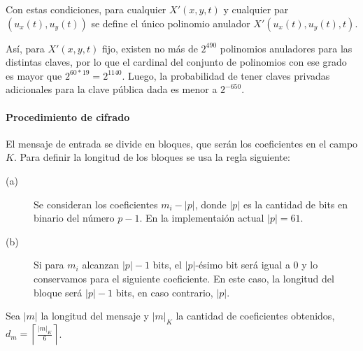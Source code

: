 \documentclass[12pt]{article}
\begin{document}
Con estas condiciones, para cualquier $X'(x,y,t)$ y cualquier par  $(u_x(t),u_y(t))$ se define el \'unico polinomio anulador  $X'(u_x(t),u_y(t),t)$. 

As\'i, para  $X'(x,y,t)$ fijo, existen no m\'as de $2^{490}$ polinomios anuladores para las distintas claves, por lo que el cardinal del conjunto de polinomios con ese grado es mayor que $2^{60*19}=2^{1140}$. Luego, la probabilidad de tener claves privadas adicionales para la clave p\'ublica dada es menor a  $2^{-650}$.



\paragraph*{Procedimiento de cifrado}
\noindent

El mensaje de entrada se divide en bloques, que ser\'an los coeficientes en el campo $K$. Para definir la longitud de los bloques se usa la regla siguiente:


\begin{description}
\item[(a)] Se consideran los coeficientes  $m_i- |p|$, donde $|p|$ es la cantidad de bits en binario del número $p-1$. En la implementaión actual $|p|=61$.

\item[(b)] Si para $m_i$ alcanzan $|p|-1$ bits, el  $|p|$-\'esimo bit ser\'a igual a  0  y lo conservamos para el siguiente coeficiente. En este caso, la longitud del bloque ser\'a $|p|-1$ bits, en caso contrario, $|p|$.

\end{description}

Sea  $|m|$ la longitud del mensaje y  $|m|_K$ la cantidad de coeficientes obtenidos,\\$d_m=\left\lceil\frac{|m|_K}{6}\right\rceil$. 
\end{document}
